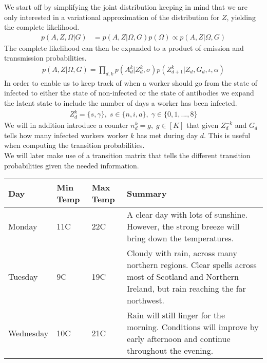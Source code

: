 We start off by simplifying the joint distribution keeping in mind that we are only interested in a variational approximation of the distribution for $Z$, yielding the complete likelihood.
\begin{align}
p(A,Z, \Omega | G) & = p(A,Z|\Omega, G)p(\Omega) \propto p(A,Z|\Omega, G) \nonumber
\end{align}
The complete likelihood can then be expanded to a product of emission and transmission probabilities.
\begin{align}
  p(A,Z|\Omega, G) = \prod_{d,k} p(A_d^k|Z_d^k, \sigma) p(Z_{d+1}^k|Z_d, G_d, \iota, \alpha)
  \label{complete_likelihood}
\end{align}
In order to enable us to keep track of when a worker should go from the state of infected to either the state of non-infected or the state of antibodies we expand the latent state to include the number of days a worker has been infected.
\begin{align}
  Z_d^k = \{s, \gamma\}, \; s \in \{n,i,a\}, \; \gamma \in \{0,1,...,8\}
\end{align}
We will in addition introduce a counter $n_d^k = g, \; g \in [K]$ that given $Z_d^{-k}$ and $G_d$ tells how many infected workers worker $k$ has met during day $d$. This is useful when computing the transition probabilities. \\

We will later make use of a transition matrix that tells the different transition probabilities given the needed information.

\begin{center}
    \begin{tabular}{| l | l | l | l |}
    \hline
    Day & Min Temp & Max Temp & Summary \\ \hline
    Monday & 11C & 22C & A clear day with lots of sunshine.
    However, the strong breeze will bring down the temperatures. \\ \hline
    Tuesday & 9C & 19C & Cloudy with rain, across many northern regions. Clear spells
    across most of Scotland and Northern Ireland,
    but rain reaching the far northwest. \\ \hline
    Wednesday & 10C & 21C & Rain will still linger for the morning.
    Conditions will improve by early afternoon and continue
    throughout the evening. \\
    \hline
    \end{tabular}
\end{center}


